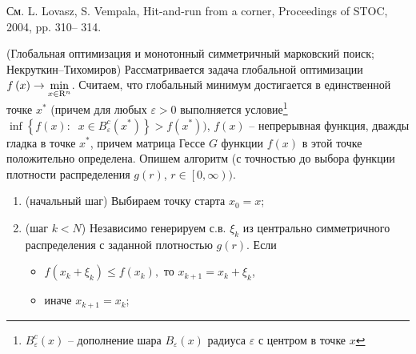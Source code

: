 \begin{remark}
См. L. Lovasz, S. Vempala, Hit-and-run from a corner, Proceedings of STOC, 2004, pp. 310– 314.
\end{remark}

\begin{problem}\DStar(Глобальная оптимизация и монотонный симметричный 
марковский поиск; Некруткин--Тихомиров) 
Рассматривается задача глобальной оптимизации $f\left( x \right)\to \mathop {\min }\limits_{x\in 
{\rm R}^n} $. Считаем, что глобальный минимум достигается в единственной 
точке $x^\ast $ (причем для любых $\varepsilon >0$ выполняется 
условие\footnote{$B_\varepsilon ^c \left( {x } \right)$ -- дополнение 
шара $B_\varepsilon { \left( x \right)}$ радиуса $\varepsilon $ с 
центром в точке $x $} $\inf \left\{ {f\left( x \right):\;\;x\in B_\varepsilon^c \left( {x^* } \right)} \right\}>f\left( {x^* } \right))$, 
$f\left( x \right)$ -- непрерывная функция, дважды гладка в точке 
$x^\ast $, причем матрица Гессе $G$ функции $f\left( x \right)$ в этой точке 
положительно определена. Опишем алгоритм (с точностью до выбора функции 
плотности распределения $g\left( r \right)$, $r\in \left[ {0,\infty } 
\right))$.

\begin{enumerate}
\item (начальный шаг) Выбираем точку старта $x_0 =x$;
\item (шаг $k<N$) Независимо генерируем с.в. $\xi _k $ из центрально симметричного распределения с заданной плотностью $g\left( r \right)$. Если
	\begin{itemize}
	\item $f\left( {x_k +\xi _k } \right)\le f\left( {x_k } \right),$ то $x_{k+1} =x_k +\xi _k $,
	\item иначе $x_{k+1} =x_k $;
	\end{itemize}


\end{enumerate}
\end{problem}
